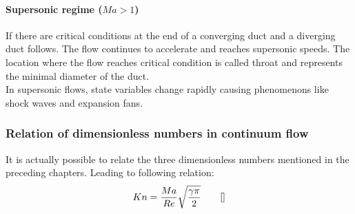 	\paragraph{Supersonic regime (\(Ma > 1\))} 
		If there are critical conditions at the end of a converging duct and a diverging duct follows.
		The flow continues to accelerate and reaches supersonic speeds.
		The location where the flow reaches critical condition is called throat and represents the minimal diameter of the duct.\\
		In supersonic flows, state variables change rapidly causing phenomenons like shock waves and expansion fans.
		

\subsubsection*{Relation of dimensionless numbers in continuum flow}
	It is actually possible to relate the three dimensionless numbers mentioned in the preceding chapters.
	Leading to following relation:
	$$
		Kn = \frac{Ma}{Re}\sqrt{\frac{\gamma \pi}{2}} \qquad \eqref{}
	$$
